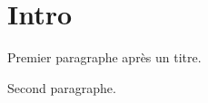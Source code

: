 \documentclass{article}
\begin{document}
\section{Intro}
Premier paragraphe apr\`es un titre.

Second paragraphe.
\end{document}
